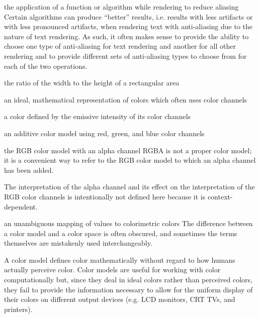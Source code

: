 the application of a function or algorithm while rendering to 
reduce aliasing
\enternote
Certain algorithms can produce ``better'' results, i.e. results with less 
artifacts or with less pronounced artifacts, when rendering text with 
anti-aliasing due to the nature of text rendering. As such, it often makes 
sense to provide the ability to choose one type of anti-aliasing for text 
rendering and another for all other rendering and to provide different sets of 
anti-aliasing types to choose from for each of the two operations.
\exitnote

the ratio of the width to the height of a rectangular area

an ideal, mathematical representation of colors which often uses color channels

a color defined by the emissive intensity of its color channels

an additive color model using red, green, and blue color channels

the RGB color model with an alpha channel
\enternote
RGBA is not a proper color model; it is a convenient way to refer to the RGB color model to which an alpha channel has been added.

The interpretation of the alpha channel and its effect on the interpretation of the RGB color channels is intentionally not defined here because it is context-dependent.
\exitnote

an unambiguous mapping of values to colorimetric colors
\enternote
The difference between a color model and a color space is often obscured, and sometimes the terms themselves are mistakenly used interchangeably.

A color model defines color mathematically without regard to how humans actually perceive color. Color models are useful for working with color computationally but, since they deal in ideal colors rather than perceived colors, they fail to provide the information necessary to allow for the uniform display of their colors on different output devices (e.g. LCD monitors, CRT TVs, and printers).

